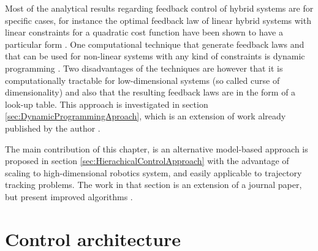 Most of the analytical results regarding feedback control of hybrid systems are for specific cases, for instance the optimal feedback law of linear hybrid systems with linear constraints for a quadratic cost function have been shown to have a particular form \cite{borrelli_dynamic_2005}. One computational technique that generate feedback laws and that can be used for non-linear systems with any kind of constraints is dynamic programming \cite{donald_e._kirk_optimal_2004}. Two disadvantages of the techniques are however that it is computationally tractable for low-dimensional systems (so called curse of dimensionality) and also that the resulting feedback laws are in the form of a look-up table. This approach is investigated in section \ref{sec:DynamicProgrammingAproach}, which is an extension of work already published by the author \cite{girard_practical_2016}.

The main contribution of this chapter, is an alternative model-based approach is proposed in section \ref{sec:HierachicalControlApproach} with the advantage of scaling to high-dimensional robotics system, and easily applicable to trajectory tracking problems. The work in that section is an extension of a journal paper, but present improved algorithms \cite{girard_leveraging_2017}.


\newpage

\section{Control architecture}
\label{sec:arch}

